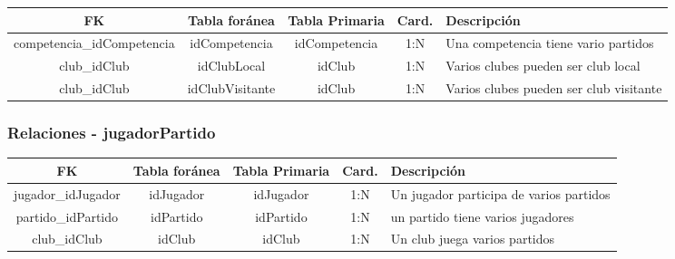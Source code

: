 \begin{table}[H]
	\centering
	\begin{tabularx}{\textwidth}{|c|c|c|c|X|} \hline
		\textbf{FK} & \textbf{Tabla foránea} & \textbf{Tabla Primaria} & \textbf{Card.} & \textbf{Descripción} \\ \hline
		competencia\_idCompetencia & idCompetencia & idCompetencia & 1:N & Una competencia tiene vario partidos \\ \hline
		club\_idClub & idClubLocal & idClub & 1:N & Varios clubes pueden ser club local \\ \hline
		club\_idClub & idClubVisitante & idClub & 1:N & Varios clubes pueden ser club visitante \\ \hline
	\end{tabularx}
\end{table}

\subsubsection{Relaciones - jugadorPartido}

\begin{table}[H]
	\centering
	\begin{tabularx}{\textwidth}{|c|c|c|c|X|} \hline
		\textbf{FK} & \textbf{Tabla foránea} & \textbf{Tabla Primaria} & \textbf{Card.} & \textbf{Descripción} \\ \hline
		jugador\_idJugador & idJugador & idJugador & 1:N & Un jugador participa de varios partidos \\ \hline
		partido\_idPartido & idPartido & idPartido & 1:N & un partido tiene varios jugadores \\ \hline
		club\_idClub & idClub & idClub & 1:N & Un club juega varios partidos \\ \hline
	\end{tabularx}
\end{table}